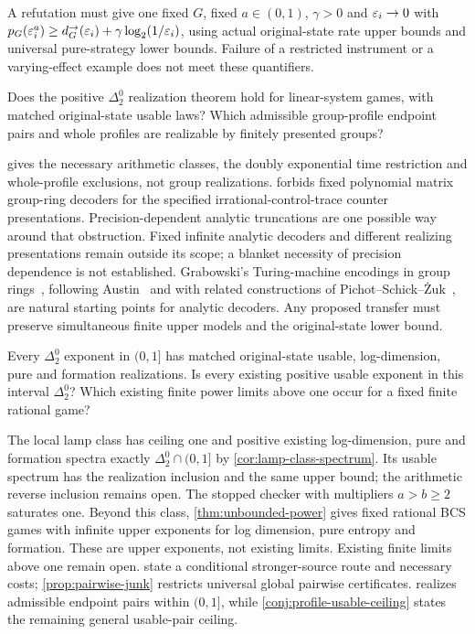 A refutation must give one fixed $G$, fixed $a\in(0,1)$, $\gamma>0$ and $\varepsilon_i\to0$ with $p_G(\varepsilon_i^a)\ge d_G^\to(\varepsilon_i)+\gamma\log_2(1/\varepsilon_i)$, using actual original-state rate upper bounds and universal pure-strategy lower bounds. Failure of a restricted instrument or a varying-effect example does not meet these quantifiers.

\begin{problem}\label{prob:linear}
Does the positive $\Delta^0_2$ realization theorem hold for linear-system games, with matched original-state usable laws? Which admissible group-profile endpoint pairs and whole profiles are realizable by finitely presented groups?
\end{problem}
 gives the necessary arithmetic classes, the doubly exponential time restriction and whole-profile exclusions, not group realizations.  forbids fixed polynomial matrix group-ring decoders for the specified irrational-control-trace counter presentations. Precision-dependent analytic truncations are one possible way around that obstruction. Fixed infinite analytic decoders and different realizing presentations remain outside its scope; a blanket necessity of precision dependence is not established. Grabowski's Turing-machine encodings in group rings~\cite{Gra14}, following Austin~\cite{Aus13} and with related constructions of Pichot--Schick--\.{Z}uk~\cite{PSZ15}, are natural starting points for analytic decoders. Any proposed transfer must preserve simultaneous finite upper models and the original-state lower bound.

\begin{problem}\label{prob:power-usable}
Every $\Delta^0_2$ exponent in $(0,1]$ has matched original-state usable, log-dimension, pure and formation realizations. Is every existing positive usable exponent in this interval $\Delta^0_2$? Which existing finite power limits above one occur for a fixed finite rational game?
\end{problem}
The local lamp class has ceiling one and positive existing log-dimension, pure and formation spectra exactly $\Delta^0_2\cap(0,1]$ by \cref{cor:lamp-class-spectrum}. Its usable spectrum has the realization inclusion and the same upper bound; the arithmetic reverse inclusion remains open. The stopped checker with multipliers $a>b\ge2$ saturates one. Beyond this class, \cref{thm:unbounded-power} gives fixed rational BCS games with infinite upper exponents for log dimension, pure entropy and formation. These are upper exponents, not existing limits. Existing finite limits above one remain open.  state a conditional stronger-source route and necessary costs; \cref{prop:pairwise-junk} restricts universal global pairwise certificates.  realizes admissible endpoint pairs within $(0,1]$, while \cref{conj:profile-usable-ceiling} states the remaining general usable-pair ceiling.

